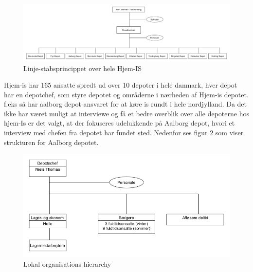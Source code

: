 \begin{landscape}
    \begin{figure}[p]
        \centering
        \includegraphics[width=\hsize]{figures/businesscase/global_hierarchy.png}
        \caption{Linje-stabsprincippet over hele Hjem-IS}
        \label{fig:global_hierarchy}
    \end{figure}        
\end{landscape}

Hjem-is har 165 ansatte spredt ud over 10 depoter i hele danmark, hver depot har en depotchef, som styre depotet og områderne i nærheden af Hjem-is depotet. f.eks så har aalborg depot ansvaret for at køre is rundt i hele nordjylland. Da det ikke har været muligt at interviewe og få et bedre overblik over alle depoterne hos hjem-Is er det valgt, at der fokuseres udelukkende på Aalborg depot, hvori et interview med chefen fra depotet har fundet sted. Nedenfor ses figur \ref{fig:local_hierarchy} som viser strukturen for Aalborg depotet. 

\begin{figure}[H]
    \centering
    \includegraphics[width=\textwidth]{figures/businesscase/local_hierarchy.png}
    \caption{Lokal organisations hierarchy}
    \label{fig:local_hierarchy}
\end{figure}

